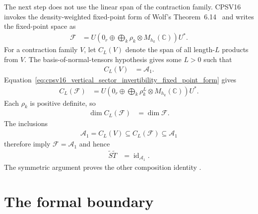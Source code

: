 \documentclass{article}
\begin{document}
The next step does not use the linear span of the contraction family. CPSV16
invokes the density-weighted fixed-point form of Wolf's
Theorem~6.14~\cite{Wolf2012Quantum} and writes the fixed-point space as
\begin{align}
    \mathcal F
        &= U\left(0_r\oplus\bigoplus_k
            \rho_k\otimes M_{h_k}(\mathbb C)\right)U^*.
    \label{eq:cpsv16_vertical_sector_invertibility_fixed_point_form}
\end{align}
For a contraction family $V$, let $C_L(V)$ denote the span of all length-$L$
products from $V$. The basis-of-normal-tensors hypothesis gives some $L>0$
such that
\begin{align}
    C_L(V)
        &= \mathcal A_1.
    \label{eq:cpsv16_vertical_sector_invertibility_contraction_product_span}
\end{align}
Equation~\ref{eq:cpsv16_vertical_sector_invertibility_fixed_point_form} gives
\begin{align}
    C_L(\mathcal F)
        &= U\left(0_r\oplus\bigoplus_k
            \rho_k^L\otimes M_{h_k}(\mathbb C)\right)U^*.
    \label{eq:cpsv16_vertical_sector_invertibility_fixed_product_span}
\end{align}
Each $\rho_k$ is positive definite, so
\begin{align}
    \dim C_L(\mathcal F)
        &= \dim\mathcal F.
    \label{eq:cpsv16_vertical_sector_invertibility_fixed_product_dimension}
\end{align}
The inclusions
\begin{align}
    \mathcal A_1
        = C_L(V)
        \subseteq C_L(\mathcal F)
        \subseteq \mathcal A_1
    \label{eq:cpsv16_vertical_sector_invertibility_product_span_inclusions}
\end{align}
therefore imply $\mathcal F=\mathcal A_1$ and hence
\begin{align}
    \widetilde S\widetilde T
        &= \operatorname{id}_{\mathcal A_1}.
    \label{eq:cpsv16_vertical_sector_invertibility_source_first_identity}
\end{align}
The symmetric argument proves the other composition identity
\cite[Appendix~C.4, lines~1980--1995]{Cirac2016MPDO_arXiv}.

\section{The formal boundary}
\end{document}
